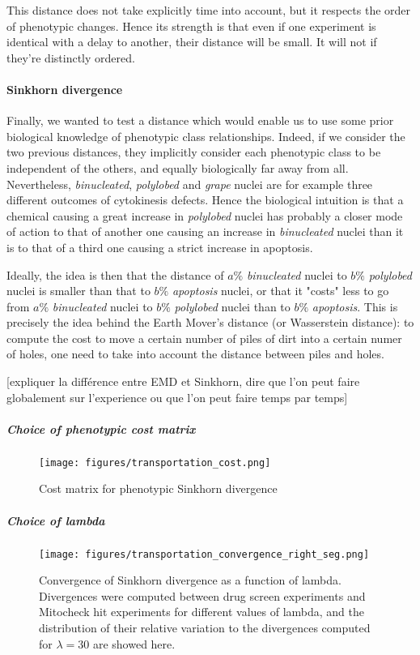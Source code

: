 This distance does not take explicitly time into account, but it respects the order of phenotypic changes. Hence its strength is that even if one experiment is identical with a delay to another, their distance will be small. It will not if they're distinctly ordered.

\paragraph{Sinkhorn divergence}
Finally, we wanted to test a distance which would enable us to use some prior biological knowledge of phenotypic class relationships. Indeed, if we consider the two previous distances, they implicitly consider each phenotypic class to be independent of the others, and equally biologically far away from all. Nevertheless, \textit{binucleated}, \textit{polylobed} and \textit{grape} nuclei are for example three different outcomes of cytokinesis defects. Hence the biological intuition is that a chemical causing a great increase in \textit{polylobed} nuclei has probably a closer mode of action to that of another one causing an increase in \textit{binucleated} nuclei than it is to that of a third one causing a strict increase in apoptosis.

Ideally, the idea is then that the distance of $a\%$ \textit{binucleated} nuclei to $b\%$ \textit{polylobed} nuclei is smaller than that to $b\%$ \textit{apoptosis} nuclei, or that it "costs" less to go from $a\%$ \textit{binucleated} nuclei to $b\%$ \textit{polylobed} nuclei than to $b\%$ \textit{apoptosis}. This is precisely the idea behind the Earth Mover's distance (or Wasserstein distance): to compute the cost to move a certain number of piles of dirt into a certain numer of holes, one need to take into account the distance between piles and holes.

[expliquer la différence entre EMD et Sinkhorn, dire que l'on peut faire globalement sur l'experience ou que l'on peut faire temps par temps]

\subparagraph{Choice of phenotypic cost matrix}
\begin{figure*}[ht!]
\centerline{\texttt{[image: figures/transportation\_cost.png]}
}
\caption{Cost matrix for phenotypic Sinkhorn divergence}
\label{cost}
\end{figure*}

\subparagraph*{Choice of lambda}
\begin{figure*}[ht!]
\centerline{\texttt{[image: figures/transportation\_convergence\_right\_seg.png]}
}
\caption{Convergence of Sinkhorn divergence as a function of lambda. Divergences were computed between drug screen experiments and Mitocheck hit experiments for different values of lambda, and the distribution of their relative variation to the divergences computed for $\lambda=30$ are showed here.}
\label{lambda_choice1}
\end{figure*}

